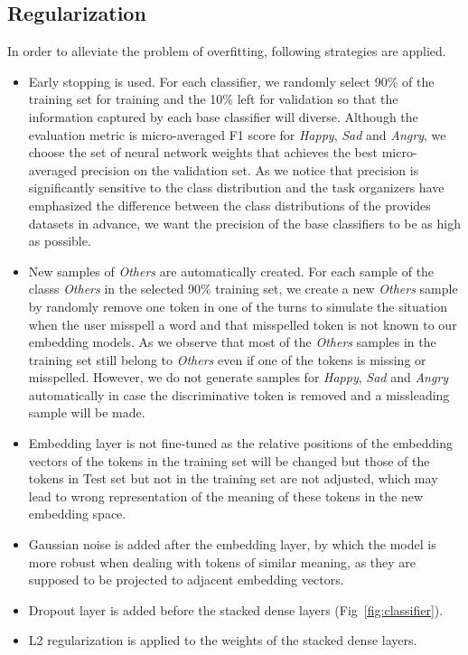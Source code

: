 \documentclass[11pt,a4paper]{article}
\begin{document}
\subsection{Regularization}

In order to alleviate the problem of overfitting, following strategies are applied.

\begin{itemize}

\item Early stopping is used. For each classifier, we randomly select 90\% of the training set for training and the 10\% left for validation so that the information captured by each base classifier will diverse. Although the evaluation metric is micro-averaged F1 score for {\em Happy}, {\em Sad} and {\em Angry}, we choose the set of neural network weights that achieves the best micro-averaged precision on the validation set. As we notice that precision is significantly sensitive to the class distribution and the task organizers have emphasized the difference between the class distributions of the provides datasets in advance, we want the precision of the base classifiers to be as high as possible.

\item New samples of {\em Others} are automatically created. For each sample of the classs {\em Others} in the selected 90\% training set, we create a new {\em Others} sample by randomly remove one token in one of the turns to simulate the situation when the user misspell a word and that misspelled token is not known to our embedding models. As we observe that most of the {\em Others} samples in the training set still belong to {\em Others} even if one of the tokens is missing or misspelled. However, we do not generate samples for {\em Happy}, {\em Sad} and {\em Angry} automatically in case the discriminative token is removed and a missleading sample will be made.

\item Embedding layer is not fine-tuned as the relative positions of the embedding vectors of the tokens in the training set will be changed but those of the tokens in Test set but not in the training set are not adjusted, which may lead to wrong representation of the meaning of these tokens in the new embedding space.

\item Gaussian noise is added after the embedding layer, by which the model is more robust when dealing with tokens of similar meaning, as they are supposed to be projected to adjacent embedding vectors.

\item Dropout layer is added before the stacked dense layers (Fig~\ref{fig:classifier}).

\item L2 regularization is applied to the weights of the stacked dense layers.

\end{itemize}
\end{document}
